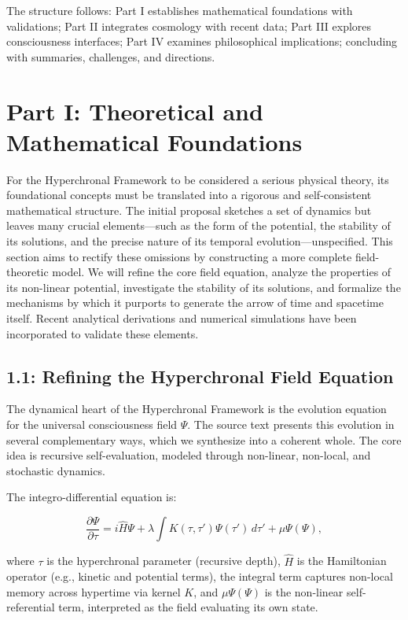 \documentclass[12pt]{article}
\theoremstyle{definition}
\begin{document}
The structure follows: Part I establishes mathematical foundations with validations; Part II integrates cosmology with recent data; Part III explores consciousness interfaces; Part IV examines philosophical implications; concluding with summaries, challenges, and directions.

\section{Part I: Theoretical and Mathematical Foundations}

For the Hyperchronal Framework to be considered a serious physical theory, its foundational concepts must be translated into a rigorous and self-consistent mathematical structure. The initial proposal sketches a set of dynamics but leaves many crucial elements—such as the form of the potential, the stability of its solutions, and the precise nature of its temporal evolution—unspecified. This section aims to rectify these omissions by constructing a more complete field-theoretic model. We will refine the core field equation, analyze the properties of its non-linear potential, investigate the stability of its solutions, and formalize the mechanisms by which it purports to generate the arrow of time and spacetime itself. Recent analytical derivations and numerical simulations have been incorporated to validate these elements.

\subsection{1.1: Refining the Hyperchronal Field Equation}

The dynamical heart of the Hyperchronal Framework is the evolution equation for the universal consciousness field $\Psi$. The source text presents this evolution in several complementary ways, which we synthesize into a coherent whole. The core idea is recursive self-evaluation, modeled through non-linear, non-local, and stochastic dynamics.

The integro-differential equation is:

\begin{equation}
\frac{\partial \Psi}{\partial \tau} = i \hat{H} \Psi + \lambda \int K(\tau, \tau') \Psi(\tau') \, d\tau' + \mu \Psi(\Psi),
\label{eq:integro}
\end{equation}

where $\tau$ is the hyperchronal parameter (recursive depth), $\hat{H}$ is the Hamiltonian operator (e.g., kinetic and potential terms), the integral term captures non-local memory across hypertime via kernel $K$, and $\mu \Psi(\Psi)$ is the non-linear self-referential term, interpreted as the field evaluating its own state.
\end{document}
